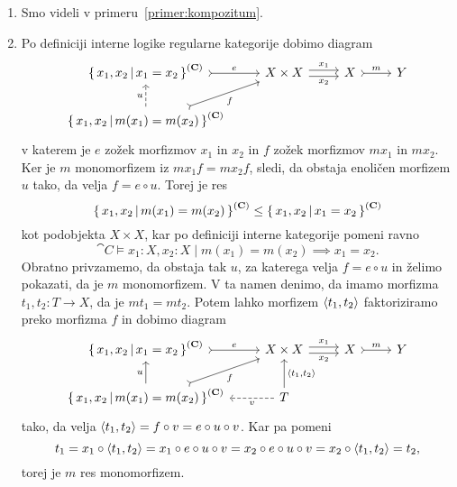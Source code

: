 \documentclass[../kategoricna_logika.tex]{subfiles}
\begin{document}
\begin{dokaz}
  \begin{enumerate}[label=(\roman*)]
  \item Smo videli v primeru~\ref{primer:kompozitum}.

  \item Po definiciji interne logike regularne
    kategorije dobimo diagram
    \begin{equation*}
      \begin{tikzcd}[column sep=normal]
        \setb{x_1,x_2}{x_1 = x_2}^{(\cat{C})} \ar[r, tail, "e"] & X \times X \ar[r, shift left, "x_1"] \ar[r, shift right, "x_2"'] & X \ar[r, tail, "m"] & Y \\
        \setb{x_1,x_2}{m(x_1) = m(x_2)}^{(\cat{C})} \ar[ur, tail,
        "f"'] \ar[u, dashed, "u"]
      \end{tikzcd}
    \end{equation*}
    v katerem je $e$ zožek morfizmov $x_1$ in $x_2$ in $f$ zožek
    morfizmov $m x_1$ in $m x_2$.  Ker je $m$ monomorfizem iz
    $m x_1 f = m x_2 f$, sledi, da obstaja enoličen morfizem $u$ tako,
    da velja $f = e \circ u$. Torej je res
      $$\left\lbrace\, x_1,x_2 \,\middle|\, m(x_1) = m(x_2) \,\right\rbrace^{({\operatorname{\mathbf{C}}})} \leq \left\lbrace\, x_1,x_2 \,\middle|\, x_1 = x_2 \,\right\rbrace^{({\operatorname{\mathbf{C}}})}$$
      kot podobjekta $X \times X$, kar po definiciji interne
      kategorije pomeni ravno
      \[\cat{C} \models x_1:X, x_2:X \mid  m(x_1) = m(x_2) \implies x_1 = x_2.\]
      Obratno privzamemo, da obstaja tak $u$, za katerega velja
      $f = e \circ u$ in želimo pokazati, da je $m$ monomorfizem.  V
      ta namen denimo, da imamo morfizma $t_1, t_2 : T \to X$, da je
      $m t_1 = m t_2$.  Potem lahko morfizem $\langle t_1, t_2 \rangle$
      faktoriziramo preko morfizma $f$ in dobimo diagram
      \begin{equation*}
        \begin{tikzcd}[column sep=normal]
          \setb{x_1,x_2}{x_1 = x_2}^{(\cat{C})} \ar[r, tail, "e"] & X \times X \ar[r, shift left, "x_1"] \ar[r, shift right, "x_2"'] & X \ar[r, tail, "m"] & Y \\
          \setb{x_1,x_2}{m(x_1) = m(x_2)}^{(\cat{C})} \ar[ur, tail,
          "f"'] \ar[u, "u"] & T \ar[u, "\fprod{t_1, t_2}"'] \ar[l,
          dashed, "v"]
        \end{tikzcd}
      \end{equation*}
      tako, da velja
      $\langle t_1, t_2 \rangle = f \circ v = e \circ u \circ v$. Kar pa
      pomeni
      $$t_1 = x_1 \circ \langle t_1, t_2 \rangle = x_1 \circ e \circ u \circ v = x_2 \circ e \circ u \circ v = x_2 \circ \langle t_1, t_2 \rangle = t_2,$$
      torej je $m$ res monomorfizem.


\end{enumerate}
\end{dokaz}
\end{document}
